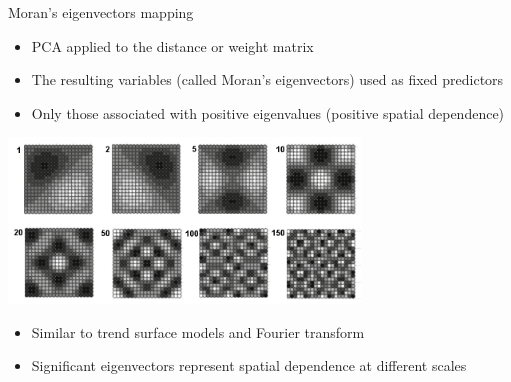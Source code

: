 \documentclass[
  ignorenonframetext,
]{beamer}
\providecommand{\tightlist}{%
  \setlength{\itemsep}{0pt}\setlength{\parskip}{0pt}}
\begin{document}
\begin{frame}{Moran's eigenvectors mapping}
\small

\begin{itemize}
\tightlist
\item
  PCA applied to the distance or weight matrix
\item
  The resulting variables (called Moran's eigenvectors) used as fixed
  predictors
\item
  Only those associated with positive eigenvalues (positive spatial
  dependence)
\end{itemize}

\includegraphics[width=0.7\textwidth,height=\textheight]{moran_eigs.png}

\begin{itemize}
\tightlist
\item
  Similar to trend surface models and Fourier transform
\item
  Significant eigenvectors represent spatial dependence at different
  scales
\end{itemize}
\end{frame}
\end{document}
